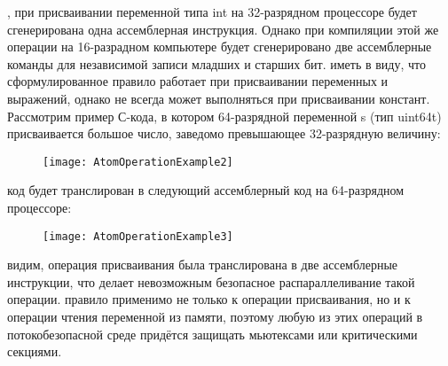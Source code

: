 {	, при присваивании переменной типа int на 32-разрядном процессоре будет сгенерирована одна ассемблерная инструкция. Однако при компиляции этой же операции на 16-разрадном компьютере будет сгенерировано две ассемблерные команды для независимой записи младших и старших бит.
	 иметь в виду, что сформулированное правило работает при присваивании переменных и выражений, однако не всегда может выполняться при присваивании констант. Рассмотрим пример С-кода, в котором 64-разрядной переменной s (тип uint64\textunderscore t) присваивается большое число, заведомо превышающее 32-разрядную величину:
	\begin{figure}[H]
		\texttt{[image: AtomOperationExample2]}
	\end{figure}
	 код будет транслирован в следующий ассемблерный код на 64-разрядном процессоре:
	\begin{figure}[H]
		\texttt{[image: AtomOperationExample3]}
	\end{figure}
	 видим, операция присваивания была транслирована в две ассемблерные инструкции, что делает невозможным безопасное распараллеливание такой операции.
	 правило применимо не только к операции присваивания, но и к операции чтения переменной из памяти, поэтому любую из этих операций в потокобезопасной среде придётся защищать мьютексами или критическими секциями.
	\par
}